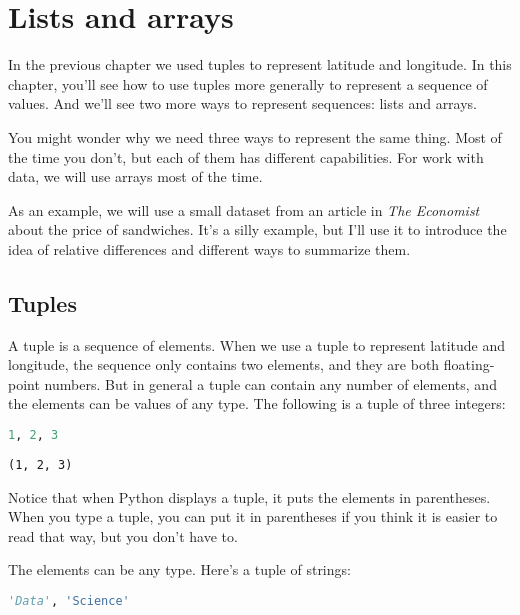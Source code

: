 \hypertarget{lists-and-arrays}{%
\chapter{Lists and arrays}\label{lists-and-arrays}}

In the previous chapter we used tuples to represent latitude and
longitude. In this chapter, you'll see how to use tuples more generally
to represent a sequence of values. And we'll see two more ways to
represent sequences: lists and arrays.

You might wonder why we need three ways to represent the same thing.
Most of the time you don't, but each of them has different capabilities.
For work with data, we will use arrays most of the time.

As an example, we will use a small dataset from an article in \emph{The
Economist} about the price of sandwiches. It's a silly example, but I'll
use it to introduce the idea of relative differences and different ways
to summarize them.

\hypertarget{tuples}{%
\section{Tuples}\label{tuples}}

A tuple is a sequence of elements. When we use a tuple to represent
latitude and longitude, the sequence only contains two elements, and
they are both floating-point numbers. But in general a tuple can contain
any number of elements, and the elements can be values of any type. The
following is a tuple of three integers:

\begin{lstlisting}[language=Python,style=source]
1, 2, 3
\end{lstlisting}

\begin{lstlisting}[style=output]
(1, 2, 3)
\end{lstlisting}

Notice that when Python displays a tuple, it puts the elements in
parentheses. When you type a tuple, you can put it in parentheses if you
think it is easier to read that way, but you don't have to.

The elements can be any type. Here's a tuple of strings:

\begin{lstlisting}[language=Python,style=source]
'Data', 'Science'
\end{lstlisting}

